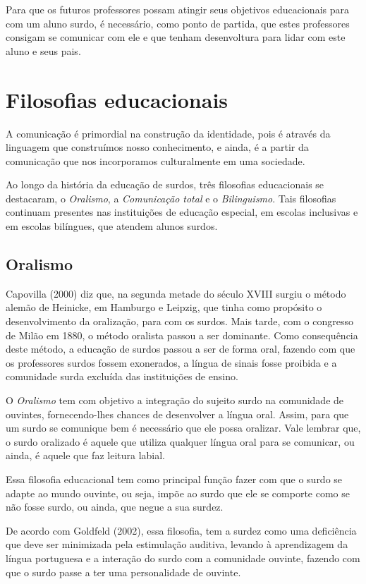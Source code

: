 \documentclass[brasil]{abnt}
\begin{document}
	Para que os futuros professores possam atingir seus objetivos educacionais para com um aluno surdo, é necessário, como ponto de partida, que estes professores consigam se comunicar com ele e que tenham desenvoltura 
	para lidar com este aluno e seus pais.

\chapter{Filosofias educacionais}
		A comunicação é primordial na construção da identidade, pois é através da linguagem que construímos nosso conhecimento, e ainda, é a partir da comunicação que nos incorporamos culturalmente em uma 
		sociedade. 
		
		Ao longo da história da educação de surdos, três filosofias educacionais se destacaram, o \textit{Oralismo}, a \textit{Comunicação total} e o \textit{Bilinguismo}. Tais filosofias continuam presentes 
		nas instituições de educação especial, em escolas inclusivas e em escolas bilíngues, que atendem alunos surdos.
		
		\section{Oralismo}
		 Capovilla (2000) diz que, na segunda metade do século XVIII surgiu o método alemão de Heinicke, em Hamburgo e Leipzig, que tinha como propósito o desenvolvimento da oralização, para com os surdos. 
		 Mais tarde, com o congresso de Milão em 1880, o método oralista passou a ser dominante. Como consequência deste método, a educação de surdos passou a ser de forma oral, fazendo 
		 com que os professores surdos fossem exonerados, a língua de sinais fosse proibida e a comunidade surda excluída das instituições de ensino. 
		 
		 O \textit{Oralismo} tem com objetivo a integração do sujeito surdo na comunidade de ouvintes, fornecendo-lhes chances de desenvolver a língua oral. Assim, para que um surdo se comunique bem é 
		 necessário que ele possa oralizar. Vale lembrar que, o surdo oralizado é aquele que utiliza qualquer língua oral para se comunicar, ou ainda, é aquele que faz leitura labial.
		 
		 Essa filosofia educacional tem como principal função fazer com que o surdo se adapte ao mundo ouvinte, ou seja, impõe ao surdo que ele se comporte como se não fosse surdo, ou ainda, que negue a sua surdez.
		 
		 De acordo com Goldfeld (2002), essa filosofia, tem a surdez como uma deficiência que deve ser minimizada pela estimulação auditiva, levando à aprendizagem da língua portuguesa e a interação do surdo 
		 com a comunidade ouvinte, fazendo com que o surdo passe a ter uma personalidade de ouvinte.  
		 
\end{document}
